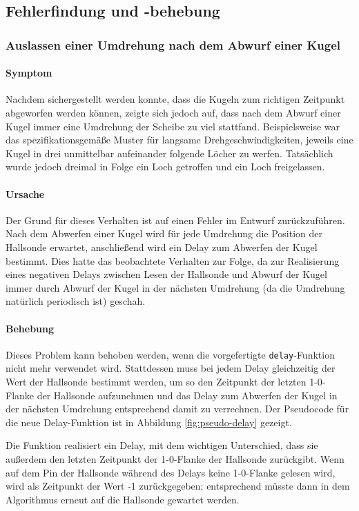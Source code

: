 \documentclass{kis}
\begin{document}
\subsection{Fehlerfindung und -behebung}
\subsubsection{Auslassen einer Umdrehung nach dem Abwurf einer Kugel}
\paragraph{Symptom}
Nachdem sichergestellt werden konnte, dass die Kugeln zum richtigen Zeitpunkt abgeworfen werden können, zeigte sich jedoch auf, dass nach dem Abwurf einer Kugel immer eine Umdrehung der Scheibe zu viel stattfand. Beispielsweise war das spezifikationsgemäße Muster für langsame Drehgeschwindigkeiten, jeweils eine Kugel in drei unmittelbar aufeinander folgende Löcher zu werfen. Tatsächlich wurde jedoch dreimal in Folge ein Loch getroffen und ein Loch freigelassen.

\paragraph{Ursache}
Der Grund für dieses Verhalten ist auf einen Fehler im Entwurf zurückzuführen. Nach dem Abwerfen einer Kugel wird für jede Umdrehung die Position der Hallsonde erwartet, anschließend wird ein Delay zum Abwerfen der Kugel bestimmt. Dies hatte das beobachtete Verhalten zur Folge, da zur Realisierung eines \glqq negativen Delays\grqq{} zwischen Lesen der Hallsonde und Abwurf der Kugel immer durch Abwurf der Kugel in der nächsten Umdrehung (da die Umdrehung natürlich periodisch ist) geschah. 

\paragraph{Behebung}
Dieses Problem kann behoben werden, wenn die vorgefertigte \texttt{delay}-Funktion nicht mehr verwendet wird. Stattdessen muss bei jedem Delay gleichzeitig der Wert der Hallsonde bestimmt werden, um so den Zeitpunkt der letzten 1-0-Flanke der Hallsonde aufzunehmen und das Delay zum Abwerfen der Kugel in der nächsten Umdrehung entsprechend damit zu verrechnen. Der Pseudocode für die neue Delay-Funktion ist in Abbildung \ref{fig:pseudo-delay} gezeigt.

Die Funktion realisiert ein Delay, mit dem wichtigen Unterschied, dass sie außerdem den letzten Zeitpunkt der 1-0-Flanke der Hallsonde zurückgibt. Wenn auf dem Pin der Hallsonde während des Delays keine 1-0-Flanke gelesen wird, wird als Zeitpunkt der Wert -1 zurückgegeben; entsprechend müsste dann in dem Algorithmus erneut auf die Hallsonde gewartet werden.
\end{document}
